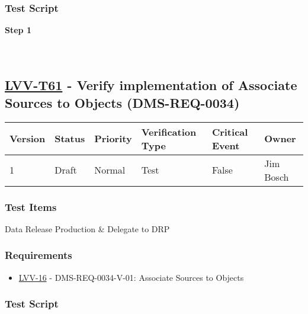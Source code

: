 \hypertarget{test-script-37}{%
\subsubsection{Test Script}\label{test-script-37}}

\textbf{Step 1}\\
~\\
~\\

\hypertarget{lvv-t61---verify-implementation-of-associate-sources-to-objects-dms-req-0034}{%
\subsection{\texorpdfstring{\href{https://jira.lsstcorp.org/secure/Tests.jspa\#/testCase/LVV-T61}{LVV-T61}
- Verify implementation of Associate Sources to Objects
(DMS-REQ-0034)}{LVV-T61 - Verify implementation of Associate Sources to Objects (DMS-REQ-0034)}}\label{lvv-t61---verify-implementation-of-associate-sources-to-objects-dms-req-0034}}

\begin{longtable}[]{@{}llllll@{}}
\toprule
Version & Status & Priority & Verification Type & Critical Event &
Owner\tabularnewline
\midrule
\endhead
1 & Draft & Normal & Test & False & Jim Bosch\tabularnewline
\bottomrule
\end{longtable}

\hypertarget{test-items-37}{%
\subsubsection{Test Items}\label{test-items-37}}

Data Release Production \& Delegate to DRP

\hypertarget{requirements-38}{%
\subsubsection{Requirements}\label{requirements-38}}

\begin{itemize}
\tightlist
\item
  \href{https://jira.lsstcorp.org/browse/LVV-16}{LVV-16} -
  DMS-REQ-0034-V-01: Associate Sources to Objects
\end{itemize}

\hypertarget{test-script-38}{%
\subsubsection{Test Script}\label{test-script-38}}

